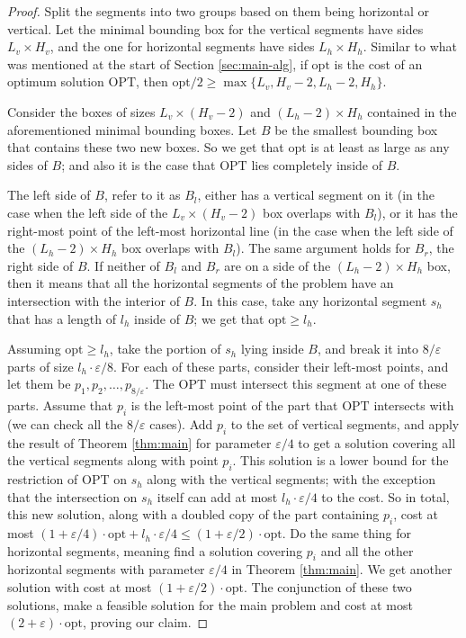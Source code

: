 \documentclass[pdflatex,sn-mathphys-num]{sn-jnl}
\theoremstyle{thmstyleone}
\newcommand{\eps}{\varepsilon}
\newcommand{\opt}{{\text{opt}}}
\newcommand{\OPT}{{\text{OPT}}}
\begin{document}
\begin{proof}
    Split the segments into two groups based on them being horizontal or vertical. Let the minimal bounding box for the vertical segments have sides $ L_v\times H_v $, and the one for horizontal segments have sides $ L_h \times H_h $. Similar to what was mentioned at the start of Section \ref{sec:main-alg}, if $ \opt $ is the cost of an optimum solution $ \OPT $, then $ \opt/2 \ge \max\{ L_v, H_v - 2, L_h - 2, H_h \}$.
		
    Consider the boxes of sizes $ L_v\times (H_v - 2) $ and $ (L_h - 2)\times H_h $ contained in the aforementioned minimal bounding boxes. Let $ B $ be the smallest bounding box that contains these two new boxes. So we get that $ \opt $ is at least as large as any sides of $ B $; and also it is the case that $ \OPT $ lies completely inside of $ B $. 
    
    The left side of $ B $, refer to it as $ B_l $, either has a vertical segment on it (in the case when the left side of the $ L_v\times (H_v - 2) $ box overlaps with $ B_l $), or it has the right-most point of the left-most horizontal line (in the case when the left side of the $ (L_h - 2)\times H_h $ box overlaps with $ B_l $). The same argument holds for $ B_r $, the right side of $ B $. If neither of $ B_l $ and $ B_r $ are on a side of the $ (L_h - 2)\times H_h $ box, then it means that all the horizontal segments of the problem have an intersection with the interior of $ B $. In this case, take any horizontal segment $ s_h $ that has a length of $ l_h $ inside of $ B $; we get that $ \opt \ge l_h $.
    
    Assuming $ \opt \ge l_h $, take the portion of $ s_h $ lying inside $ B $, and break it into $ 8/\eps $ parts of size $ l_h\cdot \eps/8 $. For each of these parts, consider their left-most points, and let them be $ p_1, p_2,\dots, p_{8/\eps} $. The $ \OPT $ must intersect this segment at one of these parts. Assume that $ p_i $ is the left-most point of the part that $ \OPT $ intersects with (we can check all the $ 8/\eps $ cases). 
    Add $ p_i $ to the set of vertical segments, and apply the result of Theorem \ref{thm:main} for parameter $ \eps/4 $ to get a solution covering all the vertical segments along with point $ p_i $.
    This solution is a lower bound for the restriction of $ \OPT $ on $ s_h $ along with the vertical segments; with the exception that the intersection on $ s_h $ itself can add at most $ l_h\cdot \eps/4 $ to the cost. So in total, this new solution, along with a doubled copy of the part containing $ p_i $, cost at most $ (1 +\eps/4)\cdot \opt + l_h\cdot\eps/4 \le (1 + \eps/2)\cdot \opt $.
    Do the same thing for horizontal segments, meaning find a solution covering $ p_i $ and all the other horizontal segments with parameter $ \eps/4 $ in Theorem \ref{thm:main}. We get another solution with cost at most $ (1 + \eps/2)\cdot \opt$.
    The conjunction of these two solutions, make a feasible solution for the main problem and cost at most $ (2 + \eps)\cdot \opt $, proving our claim.
    

\end{proof}
\end{document}
